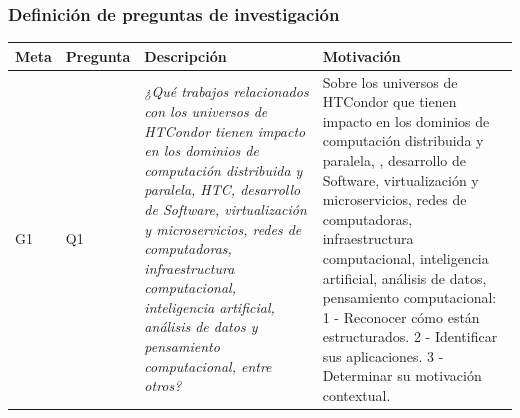 \subsubsection{Definición de preguntas de investigación}\label{subsubsec:RQ-def}
\begin{table}[H]
	\centering
	\renewcommand{\arraystretch}{1.2} %
	\fontsize{9pt}{10pt}\selectfont %
	\begin{tabular}{|p{0.7cm}|p{1.3cm}|p{5.5cm}|p{6cm}|} %
		\hline
		\textbf{Meta}                                                                                                                                                                                                                                                                                                                                    & \textbf{Pregunta} & \textbf{Descripción} & \textbf{Motivación}        \\ \hline

		G1                                                                                                                                                                                                                                                                                                                                               & Q1                &
		\textit{¿Qué trabajos relacionados con los universos de HTCondor tienen impacto en los dominios de computación distribuida y paralela, HTC, desarrollo de Software, virtualización y microservicios, redes de computadoras, infraestructura computacional, inteligencia artificial, análisis de datos y pensamiento computacional, entre otros?} &
		Sobre los universos de HTCondor que tienen impacto en los dominios de computación distribuida y paralela, \HTC, desarrollo de Software, virtualización y microservicios, redes de computadoras, infraestructura computacional, inteligencia artificial, análisis de datos, pensamiento computacional: 1 - Reconocer cómo están estructurados. 2 - Identificar sus aplicaciones. 3 - Determinar su motivación contextual. \\ \hline


\end{tabular}
\end{table}
